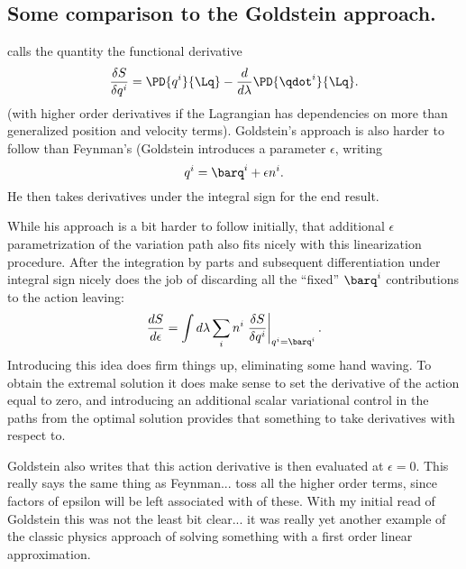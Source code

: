 \subsection{Some comparison to the Goldstein approach.}
%
\citep{goldstein1951cm} calls the quantity  the functional derivative
%
\begin{equation}\label{eqn:eulerLagrange:122}
\frac{\delta S}{\delta q^i} = \PD{q^i}{\Lq} -\frac{d}{d\lambda} \PD{\qdot^i}{\Lq}.
\end{equation}
%
(with higher order derivatives if the Lagrangian has dependencies on more than generalized position and velocity terms).  Goldstein's
approach is also harder to follow than Feynman's (Goldstein introduces a parameter \(\epsilon\), writing
%
\begin{equation}\label{eqn:euler_lagrange:epsilonvariation}
q^i = \barq^i + \epsilon n^i.
\end{equation}
%
He then takes derivatives under the integral sign for the end result.

While his approach is a bit harder to follow initially, that additional \(\epsilon\) parametrization of the variation path also fits nicely with this
linearization procedure.
After the integration by parts and subsequent differentiation under integral sign nicely does the job of
discarding all the ``fixed'' \(\barq^i\) contributions to the action leaving:
%
\begin{equation}\label{eqn:eulerLagrange:142}
\frac{dS}{d\epsilon} = \int d\lambda \sum_i n^i \left. \frac{\delta S}{\delta q^i} \right\vert_{q^i = \barq^i}.
\end{equation}
%
Introducing this idea does firm things up, eliminating some hand waving.  To obtain the extremal solution it does
make sense to set the derivative of the action equal to zero, and introducing an additional scalar variational control
in the paths from the optimal solution provides that something to take derivatives with respect to.

Goldstein also writes that this action derivative is then evaluated at \(\epsilon = 0\).  This really says the same
thing as Feynman... toss all the higher order terms, since factors of epsilon will be left associated with of these.
With my initial read of Goldstein this was not the least bit clear... it was really yet another example of the classic
physics approach of solving something with a first order linear approximation.
%
